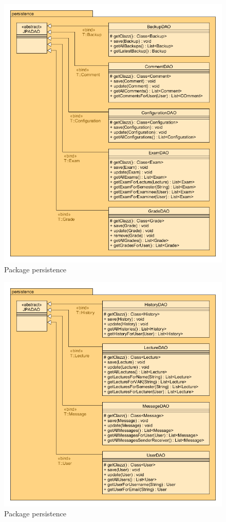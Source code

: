 \begin{figure}[H]
\includegraphics[width=\textwidth]{../UMLDiagramme/persistence/gfx/4_package_persistence_part_1.png}
	\caption{Package persistence}
\end{figure}

\begin{figure}[H]
\includegraphics[width=\textwidth]{../UMLDiagramme/persistence/gfx/4_package_persistence_part_2.png}
	\caption{Package persistence}
\end{figure}

